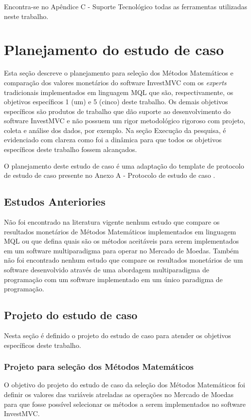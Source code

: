 Encontra-se no Apêndice C - Suporte Tecnológico todas as ferramentas utilizadas neste trabalho.

\section{Planejamento do estudo de caso}

Esta seção descreve o planejamento para seleção dos Métodos Matemáticos e comparação dos valores monetários do software InvestMVC com os \textit{experts} tradicionais implementados em linguagem MQL que são, respectivamente, os objetivos específicos 1 (um) e 5 (cinco) deste trabalho. Os demais objetivos específicos são produtos de trabalho que dão suporte ao desenvolvimento do software InvestMVC e não possuem um rigor metodológico rigoroso com projeto, coleta e análise dos dados, por exemplo. Na seção Execução da pesquisa, é evidenciado com clareza como foi a dinâmica para que todos os objetivos específicos deste trabalho fossem alcançados.

 O planejamento deste estudo de caso é uma adaptação do template de protocolo de estudo de caso presente no Anexo A - Protocolo de estudo de caso \cite{brereton}.

\subsection{Estudos Anteriories}
Não foi encontrado na literatura vigente nenhum estudo que compare os resultados monetários de Métodos Matemáticos implementados em linguagem MQL ou que defina quais são os métodos aceitáveis para serem implementados em um software multiparadigma para operar no Mercado de Moedas. Também não foi encontrado nenhum estudo que compare os resultados monetários de um software desenvolvido através de uma abordagem multiparadigma de programação com um software implementado em um único paradigma de programação.

\subsection{Projeto do estudo de caso}
Nesta seção é definido o projeto do estudo de caso para atender os objetivos específicos deste trabalho.

\subsubsection{Projeto para seleção dos Métodos Matemáticos}
O objetivo do projeto do estudo de caso da seleção dos Métodos Matemáticos foi definir os valores das variáveis atreladas as operações no Mercado de Moedas para que fosse possível selecionar os métodos a serem implementados no software InvestMVC.


